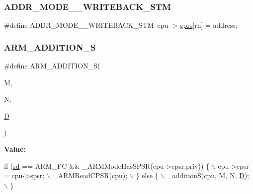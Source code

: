 \subsubsection{\texorpdfstring{A\+D\+D\+R\+\_\+\+M\+O\+D\+E\+\_\+\_\+\+W\+R\+I\+T\+E\+B\+A\+C\+K\+\_\+\+S\+TM}{ADDR\_MODE\_4\_WRITEBACK\_STM}}
{\footnotesize\ttfamily \#define A\+D\+D\+R\+\_\+\+M\+O\+D\+E\+\_\+\_\+\+W\+R\+I\+T\+E\+B\+A\+C\+K\+\_\+\+S\+TM~cpu-\/$>$\mbox{\hyperlink{isa-thumb_8c_a6b4b7e13a9a144391615b217c5917bc7}{gprs}}\mbox{[}rn\mbox{]} = address;}

\mbox{\label{isa-arm_8c_a8866ca849f0ee866f15627d87ec2a08f}} 
\subsubsection{\texorpdfstring{A\+R\+M\+\_\+\+A\+D\+D\+I\+T\+I\+O\+N\+\_\+S}{ARM\_ADDITION\_S}}
{\footnotesize\ttfamily \#define A\+R\+M\+\_\+\+A\+D\+D\+I\+T\+I\+O\+N\+\_\+S(\begin{DoxyParamCaption}\item[{}]{M,  }\item[{}]{N,  }\item[{}]{\mbox{\hyperlink{_aes_8c_adef282f11138cda3d081cc21280a8d12}{D}} }\end{DoxyParamCaption})}

{\bfseries Value\+:}
\begin{DoxyCode}
\textcolor{keywordflow}{if} (\mbox{\hyperlink{isa-arm_8c_a555541ce18ed9b5fad657a06b22cb465}{rd}} == ARM\_PC && \_ARMModeHasSPSR(cpu->cpsr.priv)) \{ \(\backslash\)
        cpu->cpsr = cpu->spsr; \(\backslash\)
        \_ARMReadCPSR(cpu); \(\backslash\)
    \} \textcolor{keywordflow}{else} \{ \(\backslash\)
        \_additionS(cpu, M, N, \mbox{\hyperlink{_aes_8c_adef282f11138cda3d081cc21280a8d12}{D}}); \(\backslash\)
    \}
\end{DoxyCode}
\mbox{\label{isa-arm_8c_a60cc80890b8064edb6cbc3b46949bc53}} 
